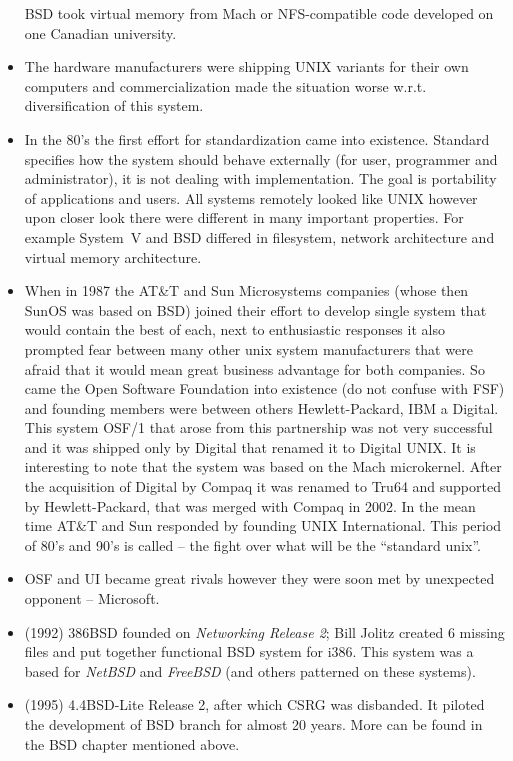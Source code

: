 \begin{itemize}
BSD took virtual memory from Mach or NFS-compatible code developed on one
Canadian university.
\item The hardware manufacturers were shipping UNIX variants for their own
computers and commercialization made the situation worse w.r.t.
diversification of this system.
\item In the 80's the first effort for standardization came into existence.
Standard specifies how the system should behave externally (for user, programmer
and administrator), it is not dealing with implementation. The goal is
portability of applications and users. All systems remotely looked like UNIX
however upon closer look there were different in many important properties.
For example System~V and BSD differed in filesystem, network architecture and
virtual memory architecture.
\item When in 1987 the AT\&T and Sun Microsystems companies (whose then SunOS
was based on BSD) joined their effort to develop single system that would
contain the best of each, next to enthusiastic responses it also prompted fear
between many other unix system manufacturers that were afraid that it would mean
great business advantage for both companies. So came the Open Software
Foundation into existence (do not confuse with FSF) and founding members were
between others Hewlett-Packard, IBM a Digital. This system OSF/1 that arose from
this partnership was not very successful and it was shipped only by Digital that
renamed it to Digital UNIX. It is interesting to note that the system was based
on the Mach microkernel. After the acquisition of Digital by Compaq it was
renamed to Tru64 and supported by Hewlett-Packard, that was merged with
Compaq in 2002. In the mean time AT\&T and Sun responded by founding UNIX
International. This period of 80's and 90's is called  -- the
fight over what will be the ``standard unix''.
\item OSF and UI became great rivals however they were soon met by unexpected
opponent -- Microsoft.
\item (1992) 386BSD founded on \emph{Networking Release 2}; Bill Jolitz
created 6 missing files and put together functional BSD system for i386.
This system was a based for \emph{NetBSD} and \emph{FreeBSD} (and others
patterned on these systems).
\item (1995) 4.4BSD-Lite Release 2, after which CSRG was disbanded. It piloted
the development of BSD branch for almost 20 years. More can be found in the BSD
chapter mentioned above.
\end{itemize}

\endinput
